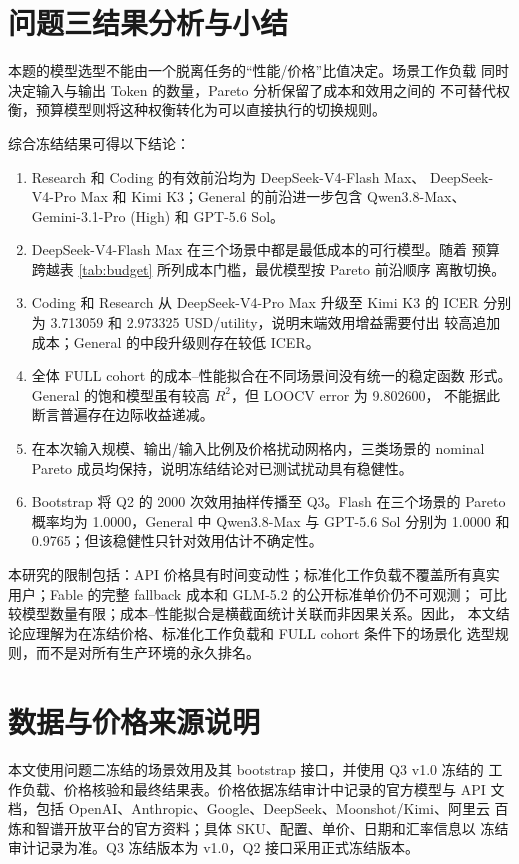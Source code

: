 \documentclass[UTF8,a4paper,11pt]{ctexart}
\begin{document}
\section{问题三结果分析与小结}

本题的模型选型不能由一个脱离任务的“性能/价格”比值决定。场景工作负载
同时决定输入与输出 Token 的数量，Pareto 分析保留了成本和效用之间的
不可替代权衡，预算模型则将这种权衡转化为可以直接执行的切换规则。

综合冻结结果可得以下结论：
\begin{enumerate}[leftmargin=2.2em,itemsep=0.2em]
\item Research 和 Coding 的有效前沿均为 DeepSeek-V4-Flash Max、
DeepSeek-V4-Pro Max 和 Kimi K3；General 的前沿进一步包含 Qwen3.8-Max、
Gemini-3.1-Pro (High) 和 GPT-5.6 Sol。
\item DeepSeek-V4-Flash Max 在三个场景中都是最低成本的可行模型。随着
预算跨越表 \ref{tab:budget} 所列成本门槛，最优模型按 Pareto 前沿顺序
离散切换。
\item Coding 和 Research 从 DeepSeek-V4-Pro Max 升级至 Kimi K3 的 ICER
分别为 3.713059 和 2.973325 USD/utility，说明末端效用增益需要付出
较高追加成本；General 的中段升级则存在较低 ICER。
\item 全体 FULL cohort 的成本--性能拟合在不同场景间没有统一的稳定函数
形式。General 的饱和模型虽有较高 $R^2$，但 LOOCV error 为 9.802600，
不能据此断言普遍存在边际收益递减。
\item 在本次输入规模、输出/输入比例及价格扰动网格内，三类场景的 nominal
Pareto 成员均保持，说明冻结结论对已测试扰动具有稳健性。
\item Bootstrap 将 Q2 的 2000 次效用抽样传播至 Q3。Flash 在三个场景的
Pareto 概率均为 1.0000，General 中 Qwen3.8-Max 与 GPT-5.6 Sol 分别为
1.0000 和 0.9765；但该稳健性只针对效用估计不确定性。
\end{enumerate}

本研究的限制包括：API 价格具有时间变动性；标准化工作负载不覆盖所有真实
用户；Fable 的完整 fallback 成本和 GLM-5.2 的公开标准单价仍不可观测；
可比较模型数量有限；成本--性能拟合是横截面统计关联而非因果关系。因此，
本文结论应理解为在冻结价格、标准化工作负载和 FULL cohort 条件下的场景化
选型规则，而不是对所有生产环境的永久排名。

\section*{数据与价格来源说明}

本文使用问题二冻结的场景效用及其 bootstrap 接口，并使用 Q3 v1.0 冻结的
工作负载、价格核验和最终结果表。价格依据冻结审计中记录的官方模型与 API
文档，包括 OpenAI、Anthropic、Google、DeepSeek、Moonshot/Kimi、阿里云
百炼和智谱开放平台的官方资料；具体 SKU、配置、单价、日期和汇率信息以
冻结审计记录为准。Q3 冻结版本为 v1.0，Q2 接口采用正式冻结版本。
\end{document}
